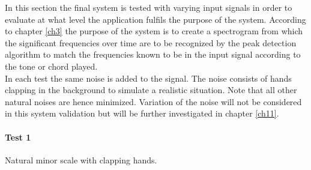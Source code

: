 In this section the final system is tested with varying input signals in order to evaluate at what level the application fulfils the purpose of the system. According to chapter \ref{ch3} the purpose of the system is to create a spectrogram from which the significant frequencies over time are to be recognized by the peak detection algorithm to match the frequencies known to be in the input signal according to the tone or chord played. \\
In each test the same noise is added to the signal. The noise consists of hands clapping in the background to simulate a realistic situation. Note that all other natural noises are hence minimized. Variation of the noise will not be considered in this system validation but will be further investigated in chapter \ref{ch11}.

\paragraph{Test 1} Natural minor scale with clapping hands.
